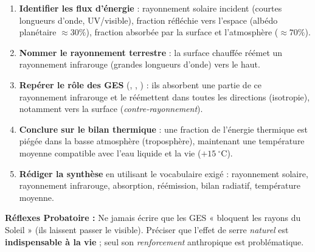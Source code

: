 \documentclass[11pt]{article}
\newcommand{\cle}[1]{{\popxbold\color{popdark}#1}}
\begin{document}
\begin{methode}
\begin{enumerate}
\item \textbf{Identifier les flux d'énergie} : rayonnement solaire incident (courtes longueurs d'onde, UV/visible), fraction réfléchie vers l'espace (albédo planétaire $\approx 30\%$), fraction absorbée par la surface et l'atmosphère ($\approx 70\%$).
\item \textbf{Nommer le rayonnement terrestre} : la surface chauffée réémet un rayonnement \cle{infrarouge} (grandes longueurs d'onde) vers le haut.
\item \textbf{Repérer le rôle des GES} (, , ) : ils \cle{absorbent} une partie de ce rayonnement infrarouge et le \cle{réémettent} dans toutes les directions (isotropie), notamment vers la surface (\emph{contre-rayonnement}).
\item \textbf{Conclure sur le bilan thermique} : une fraction de l'énergie thermique est piégée dans la basse atmosphère (troposphère), maintenant une température moyenne compatible avec l'eau liquide et la vie ($+15\ ^\circ\text{C}$).
\item \textbf{Rédiger la synthèse} en utilisant le vocabulaire exigé : rayonnement solaire, rayonnement infrarouge, absorption, réémission, bilan radiatif, température moyenne.
\end{enumerate}
\textbf{Réflexes Probatoire :} Ne jamais écrire que les GES « bloquent les rayons du Soleil » (ils laissent passer le visible). Préciser que l'effet de serre \emph{naturel} est \textbf{indispensable à la vie} ; seul son \emph{renforcement} anthropique est problématique.
\end{methode}
\end{document}
